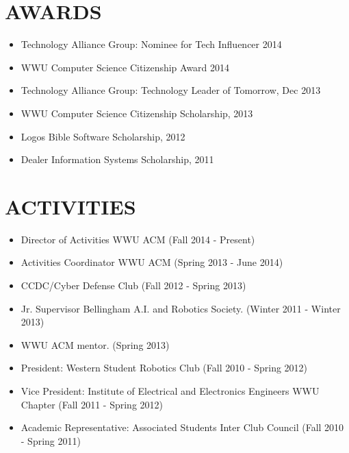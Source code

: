 \documentclass[line,margin]{res}
\begin{document}
\begin{resume}
	
\section{AWARDS}
	\begin{itemize} \itemsep -3pt
		\item Technology Alliance Group: Nominee for Tech Influencer 2014
		\item WWU Computer Science Citizenship Award 2014
		\item Technology Alliance Group: Technology Leader of Tomorrow, Dec 2013
		\item WWU Computer Science Citizenship Scholarship, 2013
		\item Logos Bible Software Scholarship, 2012
		\item Dealer Information Systems Scholarship, 2011
	\end{itemize}

\section{ACTIVITIES} 
	\begin{itemize} \itemsep -3pt
	\item Director of Activities WWU ACM {\footnotesize (Fall 2014 - Present)}
	\item Activities Coordinator WWU ACM {\footnotesize (Spring 2013 - June 2014)}
	\item CCDC/Cyber Defense Club {\footnotesize (Fall 2012 - Spring 2013)}
	\item Jr. Supervisor Bellingham A.I. and Robotics Society. {\footnotesize (Winter 2011 - Winter 2013)}
	\item WWU ACM mentor. {\footnotesize (Spring 2013)}
	\item President: Western Student Robotics Club {\footnotesize(Fall 2010 - Spring 2012)}
 	\item Vice President: Institute of Electrical and Electronics Engineers WWU Chapter {\footnotesize(Fall 2011 - Spring 2012)}
	\item Academic Representative: Associated Students Inter Club Council {\footnotesize (Fall 2010 - Spring 2011)}
	\end{itemize}
	
\end{resume}
\end{document}
